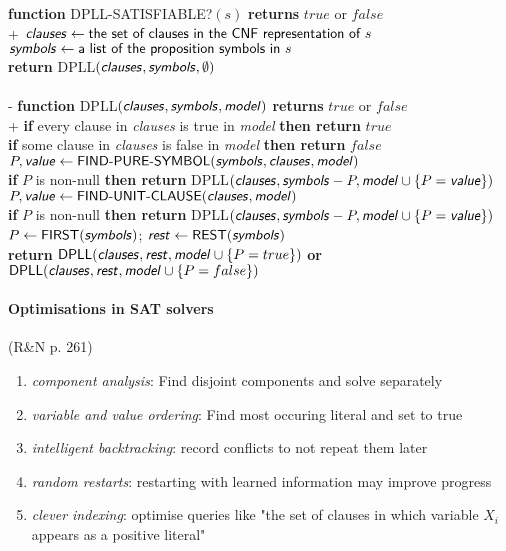 \documentclass{article}
\begin{document}
\begin{pseudo}
	\textbf{function} DPLL-SATISFIABLE?$(s)$ \textbf{returns} $true$ or $false$\\+
	$\textsf{\emph{clauses}}\leftarrow\textsf{the set of clauses in the CNF representation of }s$\\
	$\textsf{\emph{symbols}}\leftarrow\textsf{a list of the proposition symbols in }s$\\
	\textbf{return} DPLL$(\textsf{\emph{clauses}}, \textsf{\emph{symbols}}, \emptyset)$
	\\\\-
	\textbf{function} DPLL$(\textsf{\emph{clauses}}, \textsf{\emph{symbols}}, \textsf{\emph{model}})$ \textbf{returns} $true$ or $false$\\+
	\textbf{if} every clause in \emph{clauses} is true in \emph{model} \textbf{then return} $true$\\
	\textbf{if} some clause in \emph{clauses} is false in \emph{model} \textbf{then return} $false$\\
	$P,\textsf{\emph{value}}\leftarrow\textsf{FIND-PURE-SYMBOL}(\textsf{\emph{symbols}},\textsf{\emph{clauses}},\textsf{\emph{model}})$\\
	\textbf{if} $P$ is non-null \textbf{then return} DPLL$(\textsf{\emph{clauses}}, \textsf{\emph{symbols}}-P,\textsf{\emph{model}}\cup\{P=\textsf{\emph{value}}\})$\\
	$P,\textsf{\emph{value}}\leftarrow\textsf{FIND-UNIT-CLAUSE}(\textsf{\emph{clauses}}, \textsf{\emph{model}})$\\
	\textbf{if} $P$ is non-null \textbf{then return} DPLL$(\textsf{\emph{clauses}}, \textsf{\emph{symbols}}-P,\textsf{\emph{model}}\cup\{P=\textsf{\emph{value}}\})$\\
	$P\leftarrow\textsf{FIRST}(\textsf{\emph{symbols}})$; $\textsf{\emph{rest}}\leftarrow\textsf{REST}(\textsf{\emph{symbols}})$\\
	\textbf{return} $\textsf{DPLL}(\textsf{\emph{clauses}}, \textsf{\emph{rest}}, \textsf{\emph{model}}\cup\{P=true\})$ \textbf{or}
	$\textsf{DPLL}(\textsf{\emph{clauses}}, \textsf{\emph{rest}}, \textsf{\emph{model}}\cup\{P=false\})$
\end{pseudo}

\paragraph{Optimisations in SAT solvers}
(R\&N p. 261)
\begin{enumerate}
	\item \emph{component analysis}: Find disjoint components and solve separately
	\item \emph{variable and value ordering}: Find most occuring literal and set to true
	\item \emph{intelligent backtracking}: record conflicts to not repeat them later
	\item \emph{random restarts}: restarting with learned information may improve progress
	\item \emph{clever indexing}: optimise queries like "the set of clauses in which variable $X_i$ appears as a positive literal"
\end{enumerate}
\end{document}
